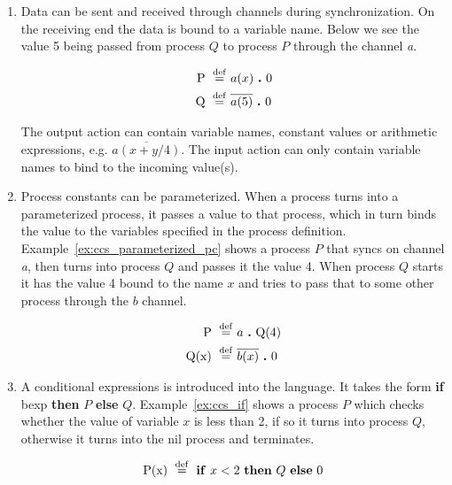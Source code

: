 	\begin{enumerate}
		\item Data can be sent and received through channels during 
		synchronization. On the receiving end the data is bound to a variable 
		name. Below we see the value 5 being passed from process $Q$ to process 
		$P$ through the channel \textit{a}.

		\begin{Exa}
			\begin{align*}
				\mathrm{P} \ \stackrel{\mathrm{def}}{=}\  & a(x) \ \textbf{.}\  0 \\
				\mathrm{Q} \ \stackrel{\mathrm{def}}{=}\  & \overline{a(5)} \ \textbf{.}\  0 
			\end{align*}	
		\end{Exa}
		
	 	The output action can contain variable names, constant values or  
	 	arithmetic expressions, e.g. $\overline{a(x+y/4)}$. The input action can 
	 	only contain variable names to bind to the incoming value(s).
		
		\item Process constants can be parameterized. When a process turns into a 
		parameterized process, it passes a value to that process, which in turn 
		binds the value to the variables specified in the process definition. 
		Example~\ref{ex:ccs_parameterized_pc} shows a process $P$ that syncs on 
		channel \textit{a}, then turns into process $Q$ and passes it the value 4. 
		When process $Q$ starts it has the value 4 bound to the name $x$ and tries 
		to pass that to some other process through the $b$ channel.

		\begin{Exa}
			\label{ex:ccs_parameterized_pc}
			\begin{align*}
				\mathrm{P} \ \stackrel{\mathrm{def}}{=}\  & a \ \textbf{.}\  \mathrm{Q(4)} \\
				\mathrm{Q(x)} \ \stackrel{\mathrm{def}}{=}\  & \overline{b(x)} \ \textbf{.}\  0 
			\end{align*}	
		\end{Exa}
		
		\item A conditional expressions is introduced into the language. It takes 
		the form \textbf{if} bexp \textbf{then} $P$ \textbf{else} $Q$. 
		Example~\ref{ex:ccs_if} shows a process $P$ which checks whether the value 
		of variable $x$ is less than 2, if so it turns into process $Q$, otherwise 
		it turns into the nil process and terminates.

		\begin{Exa}
			\label{ex:ccs_if}
			\begin{align*}
				\mathrm{P(x)} \defeq \mathbf{if}\ x < 2\ \mathbf{then}\ Q\  \mathbf{else}\ 0 
			\end{align*}	
		\end{Exa}
	\end{enumerate}
	
